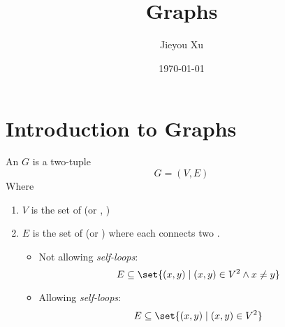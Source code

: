 \documentclass{beamer}
\title{
    \Subtitle{COMP0005 Algorithms}  \\
    {\huge Graphs}                  \\
}
\author{Jieyou Xu}
\date{\today}
\begin{document}
\frame{\titlepage}

\section{Introduction to Graphs}

\begin{frame}
    An  $G$ is a two-tuple
    \begin{equation}
        G = (V, E)
    \end{equation}
    Where
    \begin{enumerate}
        \item $V$ is the set of  (or , )
        \item $E$ is the set of  (or ) where each  connects two .\\
        \begin{itemize}
            \item Not allowing \textit{self-loops}:
            \begin{equation}
                E \subseteq \set{(x, y) \mid (x, y) \in V^2 \land x \ne y}
            \end{equation}
            \item Allowing \textit{self-loops}:
            \begin{equation}
                E \subseteq \set{(x, y) \mid (x, y) \in V^2}
            \end{equation}
        \end{itemize}
    \end{enumerate}
\end{frame}
\end{document}
